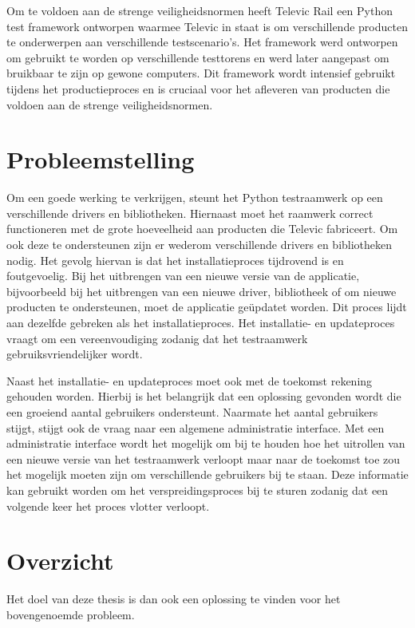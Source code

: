 Om te voldoen aan de strenge veiligheidsnormen heeft Televic Rail een Python test framework ontworpen waarmee Televic in staat is om verschillende producten te onderwerpen aan verschillende testscenario's.
Het framework werd ontworpen om gebruikt te worden op verschillende testtorens en werd later aangepast om bruikbaar te zijn op gewone computers.
Dit framework wordt intensief gebruikt tijdens het productieproces en is cruciaal voor het afleveren van producten die voldoen aan de strenge veiligheidsnormen.


\section{Probleemstelling}\label{sec:probleem}
Om een goede werking te verkrijgen, steunt het Python testraamwerk op een verschillende drivers en bibliotheken.
Hiernaast moet het raamwerk correct functioneren met de grote hoeveelheid aan producten die Televic fabriceert.
Om ook deze te ondersteunen zijn er wederom verschillende drivers en bibliotheken nodig.
Het gevolg hiervan is dat het installatieproces tijdrovend is en foutgevoelig.
Bij het uitbrengen van een nieuwe versie van de applicatie, bijvoorbeeld bij het uitbrengen van een nieuwe driver, bibliotheek of om nieuwe producten te ondersteunen, moet de applicatie geüpdatet worden.
Dit proces lijdt aan dezelfde gebreken als het installatieproces.
Het installatie- en updateproces vraagt om een vereenvoudiging zodanig dat het testraamwerk gebruiksvriendelijker wordt.

Naast het installatie- en updateproces moet ook met de toekomst rekening gehouden worden.
Hierbij is het belangrijk dat een oplossing gevonden wordt die een groeiend aantal gebruikers ondersteunt.
Naarmate het aantal gebruikers stijgt, stijgt ook de vraag naar een algemene administratie interface.
Met een administratie interface wordt het mogelijk om bij te houden hoe het uitrollen van een nieuwe versie van het testraamwerk verloopt maar naar de toekomst toe zou het mogelijk moeten zijn om verschillende gebruikers bij te staan.
Deze informatie kan gebruikt worden om het verspreidingsproces bij te sturen zodanig dat een volgende keer het proces vlotter verloopt.

\section{Overzicht}
Het doel van deze thesis is dan ook een oplossing te vinden voor het bovengenoemde probleem.